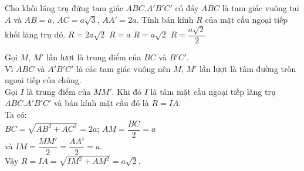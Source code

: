 \begin{ex}%
 Cho khối lăng trụ đứng tam giác $ABC.A'B'C'$ có đáy $ABC$ là tam giác vuông tại $A$ và $AB = a$, $AC = a\sqrt{3}$, $AA' = 2a$. Tính bán kính $R$ của mặt cầu ngoại tiếp khối lăng trụ đó.
 \choice
  {$R = 2a\sqrt{2}$}
  {$R = a$}
  {\True $R = a\sqrt{2}$}
  {$R = \dfrac{a\sqrt{2}}{2}$}
 \loigiai
  {
  \immini
  {
  Gọi $M$, $M'$ lần lượt là trung điểm của $BC$ và $B'C'$.\\
  Vì $ABC$ và $A'B'C'$ là các tam giác vuông nên $M$, $M'$ lần lượt là tâm đường tròn ngoại tiếp của chúng.\\
  Gọi $I$ là trung điểm của $MM'$. Khi đó $I$ là tâm mặt cầu ngoại tiếp lăng trụ $ABC.A'B'C'$ và bán kính mặt cầu đó là $R = IA$.\\
  Ta có:\\
   $BC = \sqrt{AB^2 + AC^2} = 2a$; $AM = \dfrac{BC}{2} = a$\\ và $IM = \dfrac{MM'}{2} = \dfrac{AA'}{2} = a$.\\
  Vậy $R = IA = \sqrt{IM^2 + AM^2} = a\sqrt{2}$.
  }
  {
  }
  }
\end{ex}


